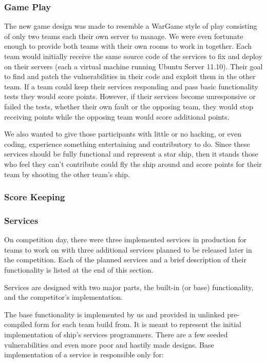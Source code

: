\documentclass[10pt]{article}
\begin{document}
\subsubsection{Game Play}
\label{stgameplay}
The new game design was made to resemble a WarGame style of play consisting of
only two teams each their own server to manage. We were even fortunate enough
to provide both teams with their own rooms to work in together. Each team would
initially receive the same source code of the services to fix and deploy on
their servers (each a virtual machine running Ubuntu Server 11.10). Their goal
to find and patch the vulnerabilities in their code and exploit them in the
other team. If a team could keep their services responding and pass basic
functionality tests they would score points. However, if their services become
unresponsive or failed the tests, whether their own fault or the opposing team,
they would stop receiving points while the opposing team would score additional
points.

We also wanted to give those participants with little or no hacking, or even
coding, experience something entertaining and contributory to do. Since these
services should be fully functional and represent a star ship, then it stands
those who feel they can't contribute could fly the ship around and score points
for their team by shooting the other team's ship.

\subsubsection{Score Keeping}
\label{stscorekeeping}

\subsubsection{Services}
\label{stservices}
On competition day, there were three implemented services in production for
teams to work on with three additional services planned to be released later in
the competition. Each of the planned services and a brief description of their
functionality is listed at the end of this section.

Services are designed with two major parts, the built-in (or base)
functionality, and the competitor's implementation.

The base functionality is implemented by us and provided in unlinked
pre-compiled form for each team build from. It is meant to represent the
initial implementation of ship's services programmers. There are a few seeded
vulnerabilities and even more poor and hastily made designs. Base
implementation of a service is responsible only for:
\end{document}
